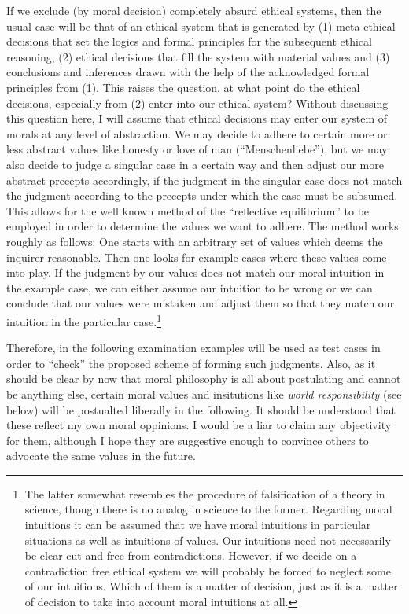 \documentclass[12pt,a4paper,ngerman]{article}
\begin{document}
If we exclude (by moral decision) completely absurd ethical systems, then the
usual case will be that of an ethical system that is generated by (1) meta
ethical decisions that set the logics and formal principles for the subsequent
ethical reasoning, (2) ethical decisions that fill the system with material
values and (3) conclusions and inferences drawn with the help of the
acknowledged formal principles from (1). This raises the question, at what
point do the ethical decisions, especially from (2) enter into our ethical
system? Without discussing this question here, I will assume that ethical
decisions may enter our system of morals at any level of abstraction. We may
decide to adhere to certain more or less abstract values like honesty or love
of man (``Menschenliebe''), but we may also decide to judge a singular case in
a certain way and then adjust our more abstract precepts accordingly, if the
judgment in the singular case does not match the judgment according to the
precepts under which the case must be subsumed. This allows for the well known
method of the ``reflective equilibrium'' to be employed in order to determine
the values we want to adhere. The method works roughly as follows: One starts
with an arbitrary set of values which deems the inquirer reasonable. Then one
looks for example cases where these values come into play. If the judgment by
our values does not match our moral intuition in the example case, we can
either assume our intuition to be wrong or we can conclude that our values
were mistaken and adjust them so that they match our intuition in the
particular case.\footnote{The latter somewhat resembles the procedure of
  falsification of a theory in science, though there is no analog in science
  to the former. Regarding moral intuitions it can be assumed that we have
  moral intuitions in particular situations as well as intuitions of values.
  Our intuitions need not necessarily be clear cut and free from
  contradictions.  However, if we decide on a contradiction free ethical
  system we will probably be forced to neglect some of our intuitions. Which
  of them is a matter of decision, just as it is a matter of decision to take
  into account moral intuitions at all.}

Therefore, in the following examination examples will be used as test
cases in order to ``check'' the proposed scheme of forming such
judgments. Also, as it should be clear by now that moral philosophy is
all about postulating and cannot be anything else, certain moral
values and insitutions like {\em world responsibility} (see below)
will be postualted liberally in the following. It should be understood
that these reflect my own moral oppinions. I would be a liar to claim
any objectivity for them, although I hope they are suggestive enough to
convince others to advocate the same values in the future.
\end{document}
